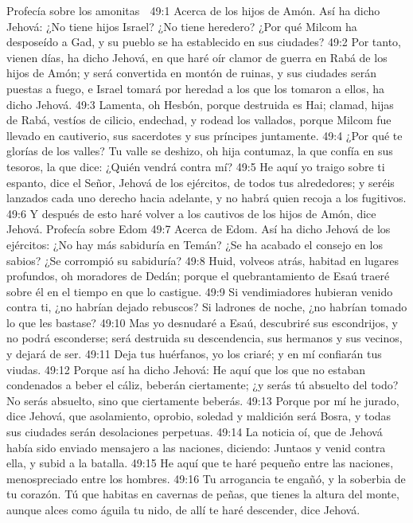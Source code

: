 Profecía sobre los amonitas  

49:1 Acerca de los hijos de Amón.  Así ha dicho Jehová: ¿No tiene hijos Israel? ¿No tiene heredero? ¿Por qué Milcom ha desposeído a Gad, y su pueblo se ha establecido en sus ciudades?  
49:2 Por tanto, vienen días, ha dicho Jehová, en que haré oír clamor de guerra en Rabá de los hijos de Amón; y será convertida en montón de ruinas, y sus ciudades serán puestas a fuego, e Israel tomará por heredad a los que los tomaron a ellos, ha dicho Jehová.  
49:3 Lamenta, oh Hesbón, porque destruida es Hai; clamad, hijas de Rabá, vestíos de cilicio, endechad, y rodead los vallados, porque Milcom fue llevado en cautiverio, sus sacerdotes y sus príncipes juntamente.  
49:4 ¿Por qué te glorías de los valles? Tu valle se deshizo, oh hija contumaz, la que confía en sus tesoros, la que dice: ¿Quién vendrá contra mí?  
49:5 He aquí yo traigo sobre ti espanto, dice el Señor, Jehová de los ejércitos, de todos tus alrededores; y seréis lanzados cada uno derecho hacia adelante, y no habrá quien recoja a los fugitivos.  
49:6 Y después de esto haré volver a los cautivos de los hijos de Amón, dice Jehová.  
Profecía sobre Edom  
49:7 Acerca de Edom. Así ha dicho Jehová de los ejércitos: ¿No hay más sabiduría en Temán? ¿Se ha acabado el consejo en los sabios? ¿Se corrompió su sabiduría?  
49:8 Huid, volveos atrás, habitad en lugares profundos, oh moradores de Dedán; porque el quebrantamiento de Esaú traeré sobre él en el tiempo en que lo castigue.  
49:9 Si vendimiadores hubieran venido contra ti, ¿no habrían dejado rebuscos? Si ladrones de noche, ¿no habrían tomado lo que les bastase?  
49:10 Mas yo desnudaré a Esaú, descubriré sus escondrijos, y no podrá esconderse; será destruida su descendencia, sus hermanos y sus vecinos, y dejará de ser.  
49:11 Deja tus huérfanos, yo los criaré; y en mí confiarán tus viudas.  
49:12 Porque así ha dicho Jehová: He aquí que los que no estaban condenados a beber el cáliz, beberán ciertamente; ¿y serás tú absuelto del todo? No serás absuelto, sino que ciertamente beberás.  
49:13 Porque por mí he jurado, dice Jehová, que asolamiento, oprobio, soledad y maldición será Bosra, y todas sus ciudades serán desolaciones perpetuas.  
49:14 La noticia oí, que de Jehová había sido enviado mensajero a las naciones, diciendo: Juntaos y venid contra ella, y subid a la batalla.  
49:15 He aquí que te haré pequeño entre las naciones, menospreciado entre los hombres.  
49:16 Tu arrogancia te engañó, y la soberbia de tu corazón. Tú que habitas en cavernas de peñas, que tienes la altura del monte, aunque alces como águila tu nido, de allí te haré descender, dice Jehová.  
